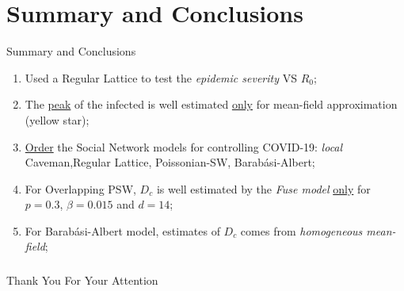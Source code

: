 \documentclass[xcolor={dvipsnames}, aspectratio = 43]{beamer}
\begin{document}
\section{Summary and Conclusions}
\begin{frame}{Summary and Conclusions}
\centering
\begin{enumerate}
	\item Used a Regular Lattice to test the \textit{epidemic severity} VS $ R_0$; 
	\item The \underline{peak} of the infected is well estimated \underline{only} for mean-field approximation (yellow star); 
	\item \underline{Order} the Social Network models for controlling COVID-19: \textit{local} Caveman,Regular Lattice, Poissonian-SW, Barabási-Albert; \\
	\item For Overlapping PSW, $ D_c$ is well estimated by the \textit{Fuse model} \underline{only} for $ p = 0.3$, $\beta = 0.015$ and $ d = 14$;
	\item For Barabási-Albert model, estimates of $ D_c$ comes from \textit{homogeneous mean-field};
\end{enumerate}
\end{frame}

\begin{frame}
	\frametitle{}
	\centering
	{\Huge Thank You For Your Attention}
\end{frame}
\end{document}
